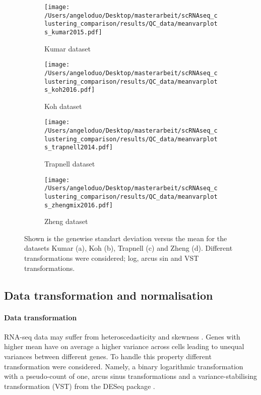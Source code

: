 \documentclass[11pt, a4paper]{article}\usepackage[]{graphicx}\usepackage[]{color}
\begin{document}
\begin{figure}
\centering
\begin{subfigure}{.5\textwidth}
  \centering
  \texttt{[image: /Users/angeloduo/Desktop/masterarbeit/scRNAseq\_clustering\_comparison/results/QC\_data/meanvarplots\_kumar2015.pdf]}
  \caption{Kumar dataset}
  \label{fig:transsim}
\end{subfigure}%
\begin{subfigure}{.5\textwidth}
  \centering
  \texttt{[image: /Users/angeloduo/Desktop/masterarbeit/scRNAseq\_clustering\_comparison/results/QC\_data/meanvarplots\_koh2016.pdf]}
  \caption{Koh dataset}
  \label{fig:transkoh}
\end{subfigure}
\begin{subfigure}{.5\textwidth}
  \centering
  \texttt{[image: /Users/angeloduo/Desktop/masterarbeit/scRNAseq\_clustering\_comparison/results/QC\_data/meanvarplots\_trapnell2014.pdf]}
  \caption{Trapnell dataset}
  \label{fig:transtrapnell}
\end{subfigure}%
\begin{subfigure}{.5\textwidth}
  \centering
  \texttt{[image: /Users/angeloduo/Desktop/masterarbeit/scRNAseq\_clustering\_comparison/results/QC\_data/meanvarplots\_zhengmix2016.pdf]}
  \caption{Zheng dataset}
  \label{fig:transzheng}
\end{subfigure}
\caption{Shown is the genewise standart deviation versus the mean for the datasets Kumar (a), Koh (b), Trapnell (c) and Zheng (d). Different transformations were considered; log, arcus sin and VST transformations. }
\label{fig:trans}
\end{figure}

\newpage
\subsection{Data transformation and normalisation}\label{ssec:norm}
\paragraph{Data transformation}
RNA-seq data may suffer from heteroscedasticity and skewness \citep{zwiener2014transforming}. Genes with higher mean have on average a higher variance across cells leading to unequal variances between different genes. 
To handle this property different transformation were considered. Namely, a binary logarithmic transformation with a pseudo-count of one, arcus sinus transformations and a variance-stabilising transformation (VST) from the DESeq package \citep{anders2010differential}. 
\end{document}
